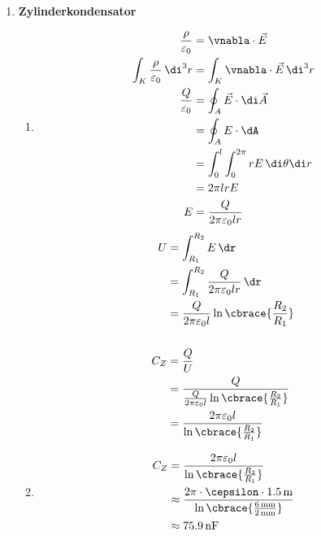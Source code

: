 \documentclass[11pt,letterpaper]{article}
\begin{document}
\begin{enumerate}
    
    \item \textbf{Zylinderkondensator}
        \begin{enumerate}
            \item 
            \begin{align*}
                \frac{\rho}{\varepsilon_0} &= \vnabla \cdot\vec{E}\\
                \int_K\frac{\rho}{\varepsilon_0} \,\di^3r &= \int _K \vnabla \cdot\vec{E} \,\di^3r\\
                \frac{Q}{\varepsilon_0} &= \oint_A \vec{E} \cdot \di \vec{A}\\
                &= \oint_A E\cdot \dA\\
                &= \int_0^l \int_{0}^{2\pi}r E \, \di \theta \di r\\
                &= 2\pi lrE\\
                E &= \frac{Q}{2\pi \varepsilon_0 lr}
            \end{align*}
            \begin{align*}
                U &= \int_{R_1}^{R_2} E \,\dr\\
                &= \int_{R_1}^{R_2} \frac{Q}{2\pi \varepsilon_0 lr} \,\dr\\
                &= \frac{Q}{2\pi \varepsilon_0 l}\ln\cbrace{\frac{R_2}{R_1}}\\
                \\
                C_Z &= \frac{Q}{U}\\
                &= \frac{Q}{\frac{Q}{2\pi \varepsilon_0 l}\ln\cbrace{\frac{R_2}{R_1}}}\\
                &= \frac{2\pi \varepsilon_0 l}{ \ln\cbrace{\frac{R_2}{R_1}}}\\
            \end{align*}

            \item
            \begin{align*} 
                C_Z &= \frac{2\pi \varepsilon_0 l}{ \ln\cbrace{\frac{R_2}{R_1}}}\\
                & \approx \frac{2\pi \cdot \cepsilon \cdot 1.5\,\mathrm{m}}{ \ln\cbrace{\frac{6\,\mathrm{mm}}{2\,\mathrm{mm}}}}\\
                & \approx 75.9\,\mathrm{nF}
            \end{align*}

        \end{enumerate}


\end{enumerate}
\end{document}
